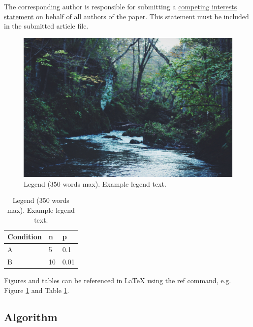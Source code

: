 \documentclass[fleqn,10pt]{wlscirep}
\begin{document}
The corresponding author is responsible for submitting a \href{http://www.nature.com/srep/policies/index.html#competing}{competing interests statement} on behalf of all authors of the paper. This statement must be included in the submitted article file.

\begin{figure}[ht]
\centering
\includegraphics[width=\linewidth]{stream}
\caption{Legend (350 words max). Example legend text.}
\label{fig:stream}
\end{figure}

\begin{table}[ht]
\centering
\begin{tabular}{|l|l|l|}
\hline
Condition & n & p \\
\hline
A & 5 & 0.1 \\
\hline
B & 10 & 0.01 \\
\hline
\end{tabular}
\caption{\label{tab:example}Legend (350 words max). Example legend text.}
\end{table}

Figures and tables can be referenced in LaTeX using the ref command, e.g. Figure \ref{fig:stream} and Table \ref{tab:example}.


\subsection*{Algorithm}
\label{algorithms}
\end{document}
